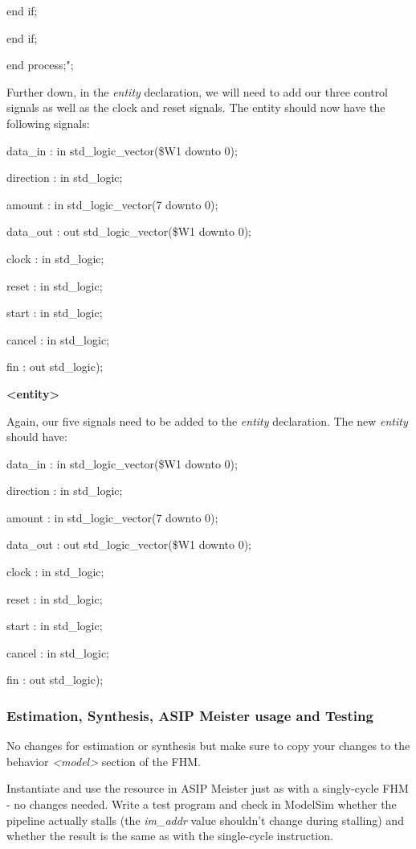 \documentclass[
]{article}
\begin{document}
end if;

end if;

end process;";

Further down, in the \emph{entity} declaration, we will need to add our
three control signals as well as the clock and reset signals. The entity
should now have the following signals:

data\_in : in std\_logic\_vector(\$W1 downto 0);

direction : in std\_logic;

amount : in std\_logic\_vector(7 downto 0);

data\_out : out std\_logic\_vector(\$W1 downto 0);

clock : in std\_logic;

reset : in std\_logic;

start : in std\_logic;

cancel : in std\_logic;

fin : out std\_logic);

\textbf{\textless entity\textgreater{}}

Again, our five signals need to be added to the \emph{entity}
declaration. The new \emph{entity} should have:

data\_in : in std\_logic\_vector(\$W1 downto 0);

direction : in std\_logic;

amount : in std\_logic\_vector(7 downto 0);

data\_out : out std\_logic\_vector(\$W1 downto 0);

clock : in std\_logic;

reset : in std\_logic;

start : in std\_logic;

cancel : in std\_logic;

fin : out std\_logic);

\hypertarget{estimation-synthesis-asip-meister-usage-and-testing}{%
\subsubsection{Estimation, Synthesis, ASIP Meister usage and
Testing}\label{estimation-synthesis-asip-meister-usage-and-testing}}

No changes for estimation or synthesis but make sure to copy your
changes to the behavior \emph{\textless model\textgreater{}} section of
the FHM.

Instantiate and use the resource in ASIP Meister just as with a
singly-cycle FHM - no changes needed. Write a test program and check in
ModelSim whether the pipeline actually stalls (the \emph{im\_addr} value
shouldn't change during stalling) and whether the result is the same as
with the single-cycle instruction.
\end{document}
